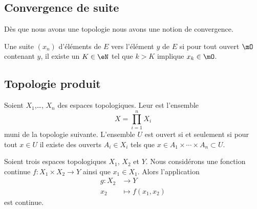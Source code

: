 \subsection{Convergence de suite}

Dès que nous avons une topologie nous avons une notion de convergence.
\begin{definition} \label{DefXSnbhZX}
    Une suite $(x_n)$ d'éléments de $E$  vers l'élément $y$ de $E$ si pour tout ouvert $\mO$ contenant $y$, il existe un $K\in \eN$ tel que $k>K$ implique $x_k\in\mO$.
\end{definition}

\subsection{Topologie produit}

\begin{definition}      \label{DefIINHooAAjTdY}
    Soient \( X_1\),\ldots, \( X_n\) des espaces topologiques. Leur  est l'ensemble
    \begin{equation}
        X=\prod_{i=1}^nX_i
    \end{equation}
    muni de la topologie suivante. L'ensemble \( U\) est ouvert si et seulement si pour tout \( x\in U\) il existe des ouverts \( A_i\in X_i \) tels que \( x\in A_1\times \cdots\times A_n\subset U\).
\end{definition}

\begin{lemma}       \label{LEMooHAODooYSPmvH}
    Soient trois espaces topologiques \( X_1\), \( X_2\) et \( Y\). Nous considérons une fonction continue \( f\colon X_1\times X_2\to Y\) ainsi que \( x_1\in X_1\). Alors l'application
    \begin{equation}
        \begin{aligned}
            g\colon X_2&\to Y \\
            x_2&\mapsto f(x_1,x_2)
        \end{aligned}
    \end{equation}
    est continue.
\end{lemma}

